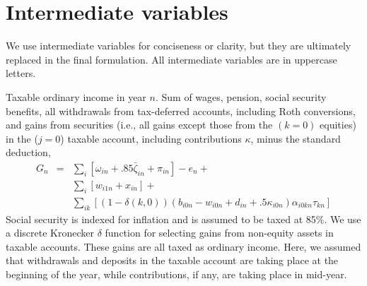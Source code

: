 \documentclass{report}[fleqn,12pt]
\begin{document}
\section{Intermediate variables}
We use intermediate variables for conciseness or clarity,
but they are ultimately replaced in the final formulation.
All intermediate variables are in uppercase letters.
\begin{description}[leftmargin=4em,style=multiline]
\item [$G_n$]
	Taxable ordinary income in year $n$. Sum of wages, pension, social security benefits, all withdrawals
	from tax-deferred accounts, including Roth conversions, and gains from securities
	(i.e., all gains except those from the $(k=0)$ equities)
	in the ($j=0$) taxable account, including contributions $\kappa$, minus the standard deduction,
	\begin{eqnarray}
		\label{Eq:Tx2}
		G_n &=& 
		\sum_{i} [\omega_{in} + .85\bar\zeta_{in} + \pi_{in}]
		- e_n +
		\nonumber \\
		&& \sum_{i} [w_{i1n} + x_{in}] +
		\nonumber \\
		&& \sum_{ik} 
		[(1-\delta(k, 0))(b_{i0n} - w_{i0n} + d_{in} + .5\kappa_{i0n})\alpha_{i0kn}\tau_{kn}]
	\end{eqnarray}
	Social security is indexed for inflation and is assumed to be taxed at 85\%.
	We use a discrete Kronecker $\delta$ function for selecting gains from non-equity assets in
	taxable accounts. These gains are all taxed as ordinary income. Here, we assumed that
	withdrawals and deposits in the taxable account are taking place at the beginning of the year, while
	contributions, if any, are taking place in mid-year.


\end{description}
\end{document}
